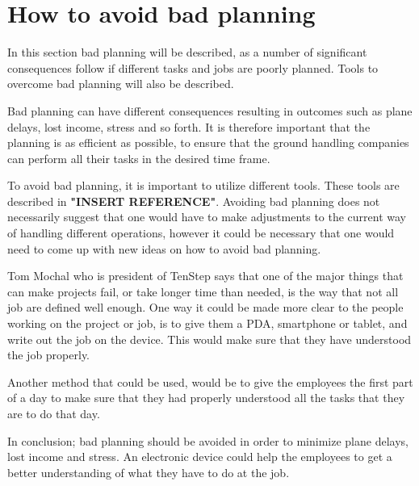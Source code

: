 \section{How to avoid bad planning}
In this section bad planning will be described, as a number of significant consequences follow if different tasks and jobs are poorly planned. Tools to overcome bad planning will also be described.

Bad planning can have different consequences resulting in outcomes such as plane delays, lost income, stress and so forth. It is therefore important that the planning is as efficient as possible, to ensure that the ground handling companies can perform all their tasks in the desired time frame.

To avoid bad planning, it is important to utilize different tools. These tools are described in \textbf{"INSERT REFERENCE"}. Avoiding bad planning does not necessarily suggest that one would have to make adjustments to the current way of handling different operations, however it could be necessary that one would need to come up with new ideas on how to avoid bad planning.

Tom Mochal who is president of TenStep \cite{AvoidP_TenStep2} says that one of the major things that can make projects fail, or take longer time than needed, is the way that not all job are defined well enough. One way it could be made more clear to the people working on the project or job, is to give them a PDA, smartphone or tablet, and write out the job on the device. This would make sure that they have understood the job properly.


Another method that could be used, would be to give the employees the first part of a day to make sure that they had properly understood all the tasks that they are to do that day.

In conclusion; bad planning should be avoided in order to minimize plane delays, lost income and stress. An electronic device could help the employees to get a better understanding of what they have to do at the job. 